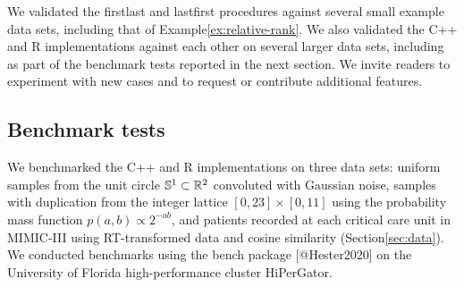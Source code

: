 \documentclass[
]{article}
\begin{document}
We validated the firstlast and lastfirst procedures against several
small example data sets, including that of
Example\nbs\ref{ex:relative-rank}. We also validated the C++ and R
implementations against each other on several larger data sets,
including as part of the benchmark tests reported in the next section.
We invite readers to experiment with new cases and to request or
contribute additional features.

\hypertarget{benchmark-tests}{%
\subsection{Benchmark tests}\label{benchmark-tests}}

We benchmarked the C++ and R implementations on three data sets: uniform
samples from the unit circle \(\mathbb{S}^1\subset\mathbb{R}^2\) convoluted with
Gaussian noise, samples with duplication from the integer lattice
\([0,23]\times[0,11]\) using the probability mass function
\(p(a,b) \propto 2^{-ab}\), and patients recorded at each critical care
unit in MIMIC-III using RT-transformed data and cosine similarity
(Section\nbs\ref{sec:data}). We conducted benchmarks using the bench
package {[}@Hester2020{]} on the University of Florida high-performance
cluster HiPerGator.
\end{document}

